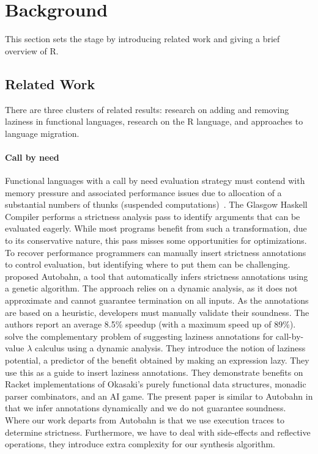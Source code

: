 \documentclass[review,nonacm,screen,acmsmall,anonymous=true]{acmart}
\begin{document}
\section{Background}

This section sets the stage by introducing related work and giving a brief
overview of R.

\subsection{Related Work}

There are three clusters of related results: research on adding and removing
laziness in functional languages, research on the R language, and approaches to
language migration.

\paragraph{Call by need}  Functional languages with
a call by need evaluation strategy must contend with memory pressure and
associated performance issues due to allocation of a substantial numbers of thunks
(suspended computations)~\cite{transformopt,stricteffective,opteval}. The
Glasgow Haskell Compiler performs a strictness analysis pass to identify
arguments that can be evaluated eagerly. While most programs benefit from such a
transformation, due to its conservative nature, this pass misses some opportunities
for optimizations. To recover performance programmers can manually insert
strictness annotations to control evaluation, but identifying where to put them
can be challenging. \citet{autobahn} proposed Autobahn, a tool that
automatically infers strictness annotations using a genetic algorithm. The
approach relies on a dynamic analysis, as it does not approximate and cannot
guarantee termination on all inputs. As the annotations are based on a
heuristic, developers must manually validate their soundness. The authors report
an average 8.5\% speedup (with a maximum speed up of 89\%). \citet{lazyprof}
solve the complementary problem of suggesting laziness annotations for
call-by-value $\lambda$ calculus using a dynamic analysis. They introduce the
notion of laziness potential, a predictor of the benefit obtained by making an
expression lazy. They use this as a guide to insert laziness annotations. They
demonstrate benefits on Racket implementations of Okasaki's purely functional
data structures, monadic parser combinators, and an AI game. The present paper
is similar to Autobahn in that we infer annotations dynamically and we do not
guarantee soundness. Where our work departs from Autobahn is that we use
execution traces to determine strictness. Furthermore, we have to deal with
side-effects and reflective operations, they introduce extra complexity for our
synthesis algorithm.
\end{document}
